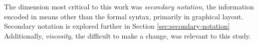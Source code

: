 
The dimension most critical to this work was \emph{secondary notation,} the information encoded in means other than the formal syntax, primarily in graphical layout. Secondary notation is explored further in Section \ref{sec:secondary-notation} Additionally, \emph{viscosity,} the difficult to make a change, was relevant to this study.

